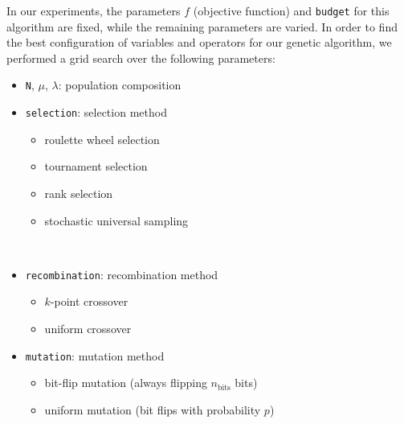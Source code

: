 \documentclass{article}
\begin{document}
\newpage


In our experiments, the parameters $f$ (objective function) and \texttt{budget} for this algorithm are fixed, while the remaining parameters are varied.
In order to find the best configuration of variables and operators for our genetic algorithm, we performed a grid search over the following parameters:

\begin{minipage}{0.4\textwidth}   
    \begin{itemize}
        \item \texttt{N}, $\mu$, $\lambda$: population composition
        \item \texttt{selection}: selection method
        \begin{itemize}
            \item roulette wheel selection
            \item tournament selection
            \item rank selection
            \item stochastic universal sampling
        \end{itemize}
    \end{itemize}
\end{minipage}
~
\begin{minipage}{0.55\textwidth}
    \begin{itemize}
        \item \texttt{recombination}: recombination method
        \begin{itemize}
            \item $k$-point crossover
            \item uniform crossover
        \end{itemize}
        \item \texttt{mutation}: mutation method
        \begin{itemize}
            \item bit-flip mutation (always flipping $n_{\mathrm{bits}}$ bits)
            \item uniform mutation (bit flips with probability $p$)
        \end{itemize}
    \end{itemize}
\end{minipage}

\end{document}
